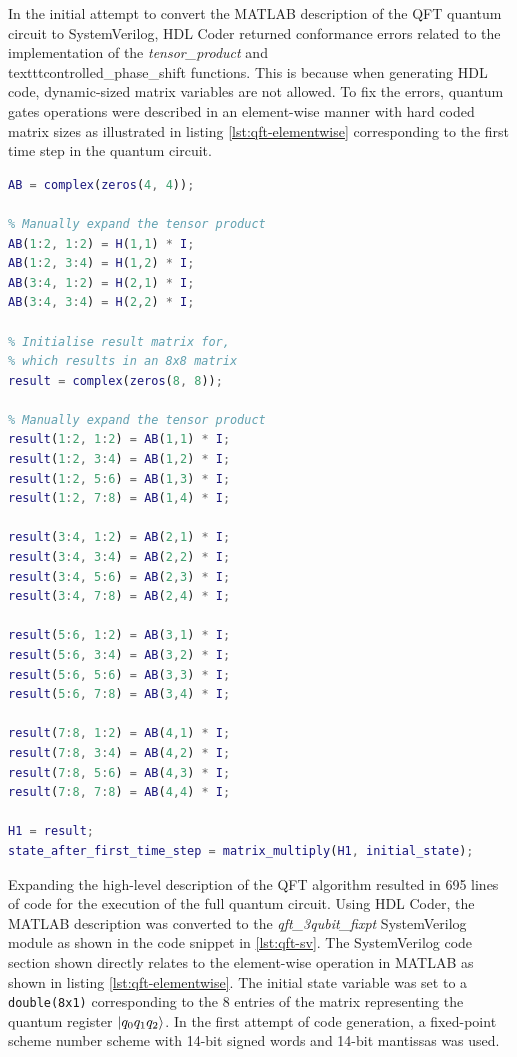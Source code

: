 In the initial attempt to convert the MATLAB description of the QFT quantum circuit to SystemVerilog, HDL Coder returned conformance errors related to the implementation of the \textit{tensor\_product} and \\texttt{controlled\_phase\_shift} functions. This is because when generating HDL code, dynamic-sized matrix variables are not allowed. To fix the errors, quantum gates operations were described in an element-wise manner with hard coded matrix sizes as illustrated in listing \ref{lst:qft-elementwise} corresponding to the first time step in the quantum circuit.
\begin{lstlisting}[language=Matlab, caption={MATLAB code fix for applying the tensor product function in using a method that conforms with HDL Coder.}, label={lst:qft-elementwise}]
% Initialise AB matrix for H ox I (4x4 matrix)
AB = complex(zeros(4, 4));

% Manually expand the tensor product
AB(1:2, 1:2) = H(1,1) * I;
AB(1:2, 3:4) = H(1,2) * I;
AB(3:4, 1:2) = H(2,1) * I;
AB(3:4, 3:4) = H(2,2) * I;

% Initialise result matrix for, 
% which results in an 8x8 matrix
result = complex(zeros(8, 8));

% Manually expand the tensor product 
result(1:2, 1:2) = AB(1,1) * I;
result(1:2, 3:4) = AB(1,2) * I;
result(1:2, 5:6) = AB(1,3) * I;
result(1:2, 7:8) = AB(1,4) * I;

result(3:4, 1:2) = AB(2,1) * I;
result(3:4, 3:4) = AB(2,2) * I;
result(3:4, 5:6) = AB(2,3) * I;
result(3:4, 7:8) = AB(2,4) * I;

result(5:6, 1:2) = AB(3,1) * I;
result(5:6, 3:4) = AB(3,2) * I;
result(5:6, 5:6) = AB(3,3) * I;
result(5:6, 7:8) = AB(3,4) * I;

result(7:8, 1:2) = AB(4,1) * I;
result(7:8, 3:4) = AB(4,2) * I;
result(7:8, 5:6) = AB(4,3) * I;
result(7:8, 7:8) = AB(4,4) * I;

H1 = result;
state_after_first_time_step = matrix_multiply(H1, initial_state);
\end{lstlisting} 
Expanding the high-level description of the QFT algorithm resulted in 695 lines of code for the execution of the full quantum circuit. Using HDL Coder, the MATLAB description was converted to the \textit{qft\_3qubit\_fixpt} SystemVerilog module as shown in the code snippet in \ref{lst:qft-sv}. The SystemVerilog code section shown directly relates to the element-wise operation in MATLAB as shown in listing \ref{lst:qft-elementwise}. The initial state variable was set to a \texttt{double(8x1)} corresponding to the 8 entries of the matrix representing the quantum register $\ket{q_0 q_1 q_2}$. In the first attempt of code generation, a fixed-point scheme number scheme with 14-bit signed words and 14-bit mantissas was used. 

